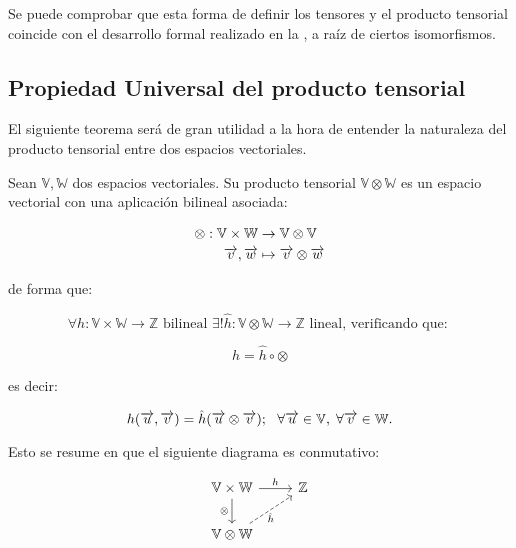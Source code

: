 \begin{observacion}
    Se puede comprobar que esta forma de definir los tensores y el producto tensorial coincide con el desarrollo formal realizado en la , a raíz de ciertos isomorfismos.
\end{observacion}

\subsection{Propiedad Universal del producto tensorial}

El siguiente teorema será de gran utilidad a la hora de entender la naturaleza del producto tensorial entre dos espacios vectoriales.

\begin{teorema} Sean $\mathbb{V}, \mathbb{W}$ dos espacios vectoriales. Su producto tensorial $\mathbb{V} \otimes \mathbb{W}$ es un espacio vectorial con una aplicación bilineal asociada:

    \begin{equation}
        \begin{split}
            \otimes : \mathbb{V} \times \mathbb{W} &\to \mathbb{V} \otimes \mathbb{V} \\
            \overrightarrow{v}, \overrightarrow{w} & \mapsto \overrightarrow{v} \otimes \overrightarrow{w}
        \end{split}
    \end{equation}

    de forma que:

    \begin{equation}
        \forall h: \mathbb{V} \times \mathbb{W} \to \mathbb{Z} \text{  bilineal  } \exists! \hat{h}: \mathbb{V} \otimes \mathbb{W} \to \mathbb{Z} \text{  lineal, verificando que: }
    \end{equation}

    \begin{equation}
        h = \hat{h} \circ \otimes
    \end{equation}

    es decir:

    \begin{equation}
        h(\overrightarrow{u}, \overrightarrow{v}) = \hat{h}(\overrightarrow{u} \otimes \overrightarrow{v});
        \ \  \forall \overrightarrow{u} \in \mathbb{V}, \; \forall \overrightarrow{v} \in \mathbb{W}.
    \end{equation}

    Esto se resume en que el siguiente diagrama es conmutativo:

    \begin{equation}
        \begin{tikzcd}
            \mathbb{V} \times \mathbb{W} \ar{r}{h} \ar{d}[left]{\otimes} & \mathbb{Z} \\
            \mathbb{V} \otimes \mathbb{W} \ar[dashed]{ur}[right, below]{\hat{h}}
        \end{tikzcd}
    \end{equation}

\end{teorema}

